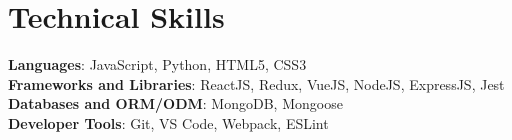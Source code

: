 \documentclass[letterpaper,12pt]{article}
\begin{document}
\section{Technical Skills}
 \begin{itemize}[leftmargin=0.15in, label={}]
    \small{\item{
     \textbf{Languages}{: JavaScript, Python, HTML5, CSS3} \\
     \textbf{Frameworks and Libraries}{: ReactJS, Redux, VueJS, NodeJS, ExpressJS, Jest} \\
     \textbf{Databases and ORM/ODM}{: MongoDB, Mongoose} \\
     \textbf{Developer Tools}{: Git, VS Code, Webpack, ESLint} \\
    }}
 \end{itemize}

 

\end{document}
